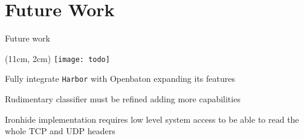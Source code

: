 \section{Future Work}

\begin{frame}{Future work}

  \begin{textblock*}{1cm}(11cm, 2cm)
    \texttt{[image: todo]}
  \end{textblock*}

  Fully integrate \texttt{Harbor} with Openbaton expanding its features

  \vfill{}

  Rudimentary classifier must be refined adding more capabilities

  \vfill{}

  Ironhide implementation requires low level system access to be able to read
  the whole TCP and UDP headers

  \vfill{}

\end{frame}